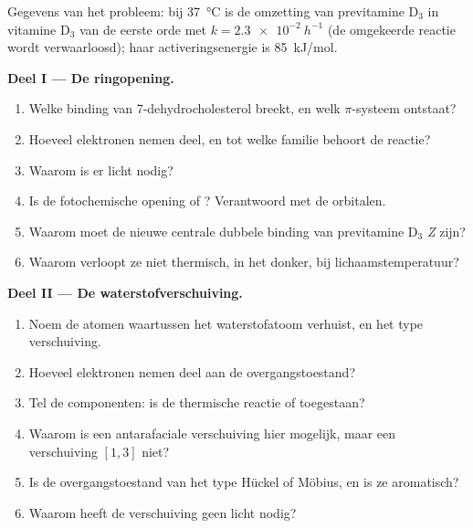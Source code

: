 \begin{problem}
\label{pb:b3:pericyclic:1}
Gegevens van het probleem: bij \qty{37}{\celsius} is de omzetting van previtamine D$_3$ in vitamine D$_3$
van de eerste orde met $k = \qty{2.3e-2}{h^{-1}}$ (de omgekeerde reactie wordt verwaarloosd); haar activeringsenergie is
\qty{85}{kJ/mol}.

\medskip\noindent\textbf{Deel I --- De ringopening.}
\begin{enumerate}
  \item Welke binding van 7-dehydrocholesterol breekt, en welk $\pi$-systeem ontstaat?
  \item Hoeveel elektronen nemen deel, en tot welke familie behoort de
        reactie?
  \item Waarom is er licht nodig?
  \item Is de fotochemische opening  of ?
        Verantwoord met de orbitalen.
  \item Waarom moet de nieuwe centrale dubbele binding van previtamine D$_3$ \textit{Z} zijn?
  \item Waarom verloopt ze niet thermisch, in het donker, bij lichaamstemperatuur?
\end{enumerate}

\medskip\noindent\textbf{Deel II --- De waterstofverschuiving.}
\begin{enumerate}[resume]
  \item Noem de atomen waartussen het waterstofatoom verhuist, en het type
        verschuiving.
  \item Hoeveel elektronen nemen deel aan de overgangstoestand?
  \item Tel de componenten: is de thermische reactie  of
         toegestaan?
  \item Waarom is een antarafaciale verschuiving hier mogelijk, maar een verschuiving $[1,3]$
        niet?
  \item Is de overgangstoestand van het type Hückel of Möbius, en is ze
        aromatisch?
  \item Waarom heeft de verschuiving geen licht nodig?
\end{enumerate}


\end{problem}
